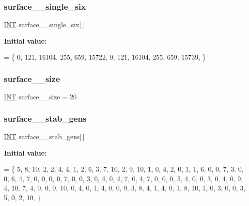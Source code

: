 \subsubsection{\texorpdfstring{surface\+\_\+\_\+single\+\_\+six}{surface\_11\_single\_six}}
{\footnotesize\ttfamily \mbox{\hyperlink{galois_8h_a09fddde158a3a20bd2dcadb609de11dc}{I\+NT}} surface\+\_\+\_\+single\+\_\+six\mbox{[}$\,$\mbox{]}}

{\bfseries Initial value\+:}
\begin{DoxyCode}
= \{ 
    0, 121, 16104, 255, 659, 15722, 
    0, 121, 16104, 255, 659, 15739, 
\}
\end{DoxyCode}
\mbox{\label{surface__11_8_c_a1618a07f3eeb952f764e8bf87b1d2c2a}} 
\subsubsection{\texorpdfstring{surface\+\_\+\_\+size}{surface\_11\_size}}
{\footnotesize\ttfamily \mbox{\hyperlink{galois_8h_a09fddde158a3a20bd2dcadb609de11dc}{I\+NT}} surface\+\_\+\_\+size = 20}

\mbox{\label{surface__11_8_c_a852ec407f354c39e2232c972b3af24fd}} 
\subsubsection{\texorpdfstring{surface\+\_\+\_\+stab\+\_\+gens}{surface\_11\_stab\_gens}}
{\footnotesize\ttfamily \mbox{\hyperlink{galois_8h_a09fddde158a3a20bd2dcadb609de11dc}{I\+NT}} surface\+\_\+\_\+stab\+\_\+gens\mbox{[}$\,$\mbox{]}}

{\bfseries Initial value\+:}
\begin{DoxyCode}
= \{
     5,  8, 10,  2,  2,  4,  4,  1,  2,  6,  3,  7, 10,  2,  9, 10, 
     1,  0,  4,  2,  0,  1,  1,  6,  0,  0,  7,  3,  0,  0,  6,  4, 
     7,  0,  0,  0,  0,  7,  0,  0,  3,  0,  4,  0,  4,  7,  0,  4, 
     7,  0,  0,  0,  5,  4,  0,  0,  3,  0,  4,  0,  9,  4, 10,  7, 
     4,  0,  0,  0, 10,  0,  4,  0,  1,  4,  0,  0,  9,  3,  8,  4, 
     1,  4,  0,  1,  8, 10,  1,  0,  3,  0,  0,  3,  5,  0,  2, 10, 
\}
\end{DoxyCode}
\mbox{\label{surface__11_8_c_a360ac4f6cfe43081d1fc034857aa194f}} 
